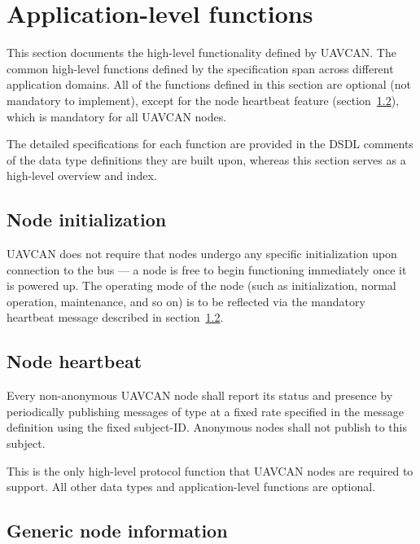 \section{Application-level functions}\label{sec:application_functions}

This section documents the high-level functionality defined by UAVCAN.
The common high-level functions defined by the specification span across different application domains.
All of the functions defined in this section are optional (not mandatory to implement),
except for the node heartbeat feature (section~\ref{sec:application_functions_heartbeat}),
which is mandatory for all UAVCAN nodes.

The detailed specifications for each function are provided in the DSDL comments of the data type definitions
they are built upon, whereas this section serves as a high-level overview and index.

\subsection{Node initialization}

UAVCAN does not require that nodes undergo any specific initialization upon connection to the bus ---
a node is free to begin functioning immediately once it is powered up.
The operating mode of the node (such as initialization, normal operation, maintenance, and so on)
is to be reflected via the mandatory heartbeat message described in section~\ref{sec:application_functions_heartbeat}.

\subsection{Node heartbeat}\label{sec:application_functions_heartbeat}

Every non-anonymous UAVCAN node shall report its status and presence by periodically publishing messages of type
 at a fixed rate specified in the message definition using the fixed subject-ID.
Anonymous nodes shall not publish to this subject.

This is the only high-level protocol function that UAVCAN nodes are required to support.
All other data types and application-level functions are optional.


\subsection{Generic node information}

